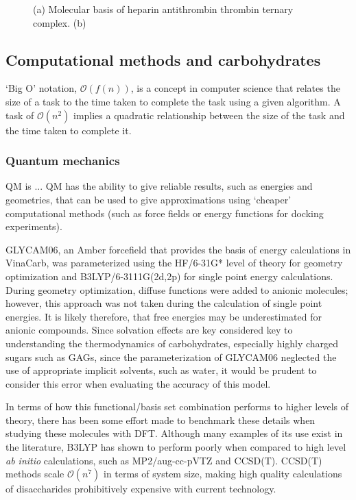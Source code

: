 \documentclass[journal=jctcce,manuscript=article]{achemso}
\begin{document}
{{\begin{figure}
    \caption{(a) Molecular basis of heparin antithrombin thrombin ternary complex. (b) }
    \label{fig:thrombin}
\end{figure}
}

\pagebreak
\subsection{Computational methods and carbohydrates}

`Big O'  notation, $\mathcal{O}(f(n))$, is a concept in computer science that relates the size of a task to the time taken to complete the task using a given algorithm. A task of $\mathcal{O}(n^{2})$ implies a quadratic relationship between the size of the task and the time taken to complete it.

\subsubsection{Quantum mechanics}
\Ac{QM} is ...
\Ac{QM} has the ability to give reliable results, such as energies and geometries, that can be used to give approximations using `cheaper' computational methods (such as force fields or energy functions for docking experiments). 

GLYCAM06, an Amber forcefield that provides the basis of energy calculations in VinaCarb, was parameterized using the HF/6-31G* level of theory for geometry optimization and B3LYP/6-3111G(2d,2p) for single point energy calculations\cite{Kirschner2008GLYCAM06:Carbohydrates}. 
During geometry optimization, diffuse functions were added to anionic molecules; however, this approach was not taken during the calculation of single point energies. It is likely therefore, that free energies may be underestimated for anionic compounds. Since solvation effects are key considered key to understanding the thermodynamics of carbohydrates, especially highly charged sugars such as \acp{GAG}, since the parameterization of GLYCAM06 neglected the use of appropriate implicit solvents, such as water, it would be prudent to consider this error when evaluating the accuracy of this model. 

In terms of how this functional/basis set combination performs to higher levels of theory, there has been some effort made to benchmark these details when studying these molecules with \ac{DFT}. Although many examples of its use exist in the literature, B3LYP has shown to perform poorly when compared to high level \textit{ab initio} calculations, such as MP2/aug-cc-pVTZ and CCSD(T). CCSD(T) methods scale $\mathcal{O}(n^{7})$ in terms of system size, making high quality calculations of disaccharides prohibitively expensive with current technology. 

}
\end{document}
